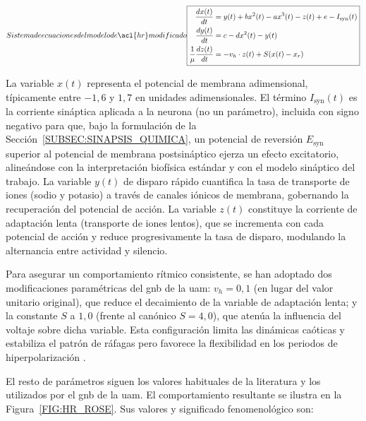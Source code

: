\begin{equation}[EQ:HR_SYSTEM]{Sistema de ecuaciones del modelo de \acl{hr} modificado}
    \boxed{
        \begin{aligned}
            \frac{dx(t)}{dt}               & = y(t) + b x^2(t) - a x^3(t) - z(t) + e - I_{\mathrm{syn}}(t) \\
            \frac{dy(t)}{dt}               & = c - d x^2(t) - y(t)                                         \\
            \frac{1}{\mu} \frac{dz(t)}{dt} & = -v_h \cdot z(t) + S(x(t) - x_r)
        \end{aligned}
    }
\end{equation}

\noindent La variable \(x(t)\) representa el potencial de membrana adimensional, típicamente entre \(-1{,}6\) y \(1{,}7\) en unidades adimensionales. El término \(I_{\mathrm{syn}}(t)\) es la corriente sináptica aplicada a la neurona (no un parámetro), incluida con signo negativo para que, bajo la formulación de la Sección~\ref{SUBSEC:SINAPSIS_QUIMICA}, un potencial de reversión \(E_{\mathrm{syn}}\) superior al potencial de membrana postsináptico ejerza un efecto excitatorio, alineándose con la interpretación biofísica estándar y con el modelo sináptico del trabajo. La variable \(y(t)\) de disparo rápido cuantifica la tasa de transporte de iones (sodio y potasio) a través de canales iónicos de membrana, gobernando la recuperación del potencial de acción. La variable \(z(t)\) constituye la corriente de adaptación lenta (transporte de iones lentos), que se incrementa con cada potencial de acción y reduce progresivamente la tasa de disparo, modulando la alternancia entre actividad y silencio.

Para asegurar un comportamiento rítmico consistente, se han adoptado dos modificaciones paramétricas del \ac{gnb} de la \ac{uam}: $v_h = 0{,}1$ (en lugar del valor unitario original), que reduce el decaimiento de la variable de adaptación lenta; y la constante $S$ a $1{,}0$ (frente al canónico $S = 4{,}0$), que atenúa la influencia del voltaje sobre dicha variable. Esta configuración limita las dinámicas caóticas y estabiliza el patrón de ráfagas pero favorece la flexibilidad en los periodos de hiperpolarización \cite{Varona2024}.

El resto de parámetros siguen los valores habituales de la literatura \cite{Phan2020} y los utilizados por el \ac{gnb} de la \ac{uam}. El comportamiento resultante se ilustra en la Figura~\ref{FIG:HR_ROSE}. Sus valores y significado fenomenológico son:

